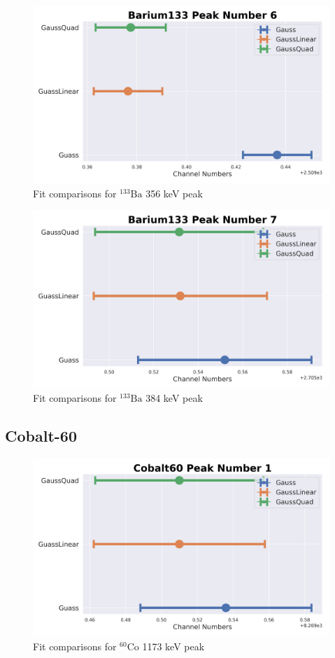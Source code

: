 \documentclass[11pt,a4paper]{article}
\newcommand{\element}[2]{$^{#2}\textrm{#1}$}
\begin{document}
\begin{figure}[H]
  \centering
  \includegraphics[width=0.95\linewidth]{./Images/Barium133/FitComparison_Peak6.png}
  \caption{Fit comparisons for \element{Ba}{133} 356 keV peak}
\end{figure}

\begin{figure}[H]
  \centering
  \includegraphics[width=0.95\linewidth]{./Images/Barium133/FitComparison_Peak7.png}
  \caption{Fit comparisons for \element{Ba}{133} 384 keV peak}
\end{figure}
\clearpage

\subsection{Cobalt-60}

\begin{figure}[H]
  \centering
  \includegraphics[width=0.95\linewidth]{./Images/Cobalt60/FitComparison_Peak1.png}
  \caption{Fit comparisons for \element{Co}{60} 1173 keV peak}
\end{figure}
\end{document}
